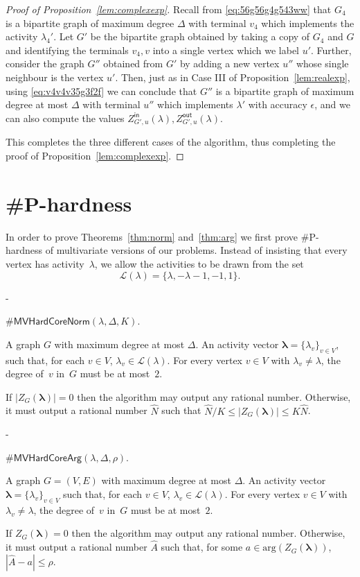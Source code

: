 \documentclass[11pt]{article}
\makeatletter
\renewcommand\arg{\text{arg}}
\def\Zin{Z^{\mathsf{in}}}
\def\Zout{Z^{\mathsf{out}}}
\def\lambdab{\ensuremath{\boldsymbol{\lambda}}}
\def\FactorMVHardCore#1{\#\ensuremath{\mathsf{MVHardCoreNorm}(\lambda,\Delta,#1)}}
\def\ArgMVHardCore#1{\#\ensuremath{\mathsf{MVHardCoreArg}(\lambda,\Delta,#1)}}
\def\prob#1#2#3{\goodbreak\begin{list}{}{\labelwidth\z@ \itemindent-\leftmargin
                        \itemsep\z@  \topsep6\p@\@plus6\p@
                        \let\makelabel\descriptionlabel}
                \item[\it Name]#1
               \item[\it Instance]                #2
                \item[\it Output]#3
                \end{list}}
\makeatother
\begin{document}
\begin{proof}[Proof of Proposition~\ref{lem:complexexp}]
Recall from \eqref{eq:56g56g4g543ww} that $G_4$ is a bipartite graph of maximum degree $\Delta$  with terminal $v_4$ which implements the activity $\lambda_4'$. Let $G'$ be the bipartite graph obtained by taking  a copy of $G_4$ and $G$ and identifying the terminals $v_4,v$ into a single vertex which we label $u'$. Further, consider the graph $G''$ obtained from $G'$ by adding a new vertex $u''$ whose single neighbour is the vertex $u'$. Then, just as in Case III of Proposition~\ref{lem:realexp}, using \eqref{eq:v4v4v35g3f2f} we can conclude that $G''$ is a bipartite graph of maximum degree at most $\Delta$ with terminal $u''$ which implements $\lambda'$ with accuracy $\epsilon$, and we can also compute the values $\Zin_{G',u}(\lambda),\Zout_{G',u}(\lambda)$.

\vskip 0.2cm

This completes the three different cases of the algorithm, thus completing the proof of Proposition~\ref{lem:complexexp}.
\end{proof}

\section{ \#P-hardness}\label{sec:reductions}

In order to prove Theorems~\ref{thm:norm} and~\ref{thm:arg} 
we first prove \#P-hardness of multivariate versions of our problems.
Instead of insisting that every vertex has activity~$\lambda$, we allow the
activities to be drawn from  
the set
\begin{equation}\label{eq:Llam}
\mathcal{L}(\lambda) = \{\lambda,-\lambda-1,-1,1\}.
\end{equation}

 \prob{
$\FactorMVHardCore{K}$.} { A  graph $G$ with maximum degree at
most $\Delta$. An activity vector $\lambdab=\{\lambda_v\}_{v\in V}$, such that, for each $v\in V$, $\lambda_v \in \mathcal{L}(\lambda)$.
For every vertex $v\in V$ with $\lambda_v\neq \lambda$, the degree of~$v$ in~$G$ must be at most~$2$.} 
{   If $|Z_G(\lambdab)|=0$  then the algorithm may output any rational number. Otherwise,
 it must output a  rational number $\widehat{N}$ such that
$\widehat{N}/K \leq
|Z_{G}(\lambdab)|\leq K \widehat{N}$. }  
 
  \prob{
$\ArgMVHardCore{\rho}$.} {A graph $G=(V,E)$ with maximum degree at
most $\Delta$. An activity vector $\lambdab=\{\lambda_v\}_{v\in V}$ such that, for each $v\in V$, $\lambda_v \in \mathcal{L}(\lambda)$.
For every vertex $v\in V$ with $\lambda_v\neq \lambda$, the degree of~$v$ in~$G$ must be at most~$2$.
 }
{ If $Z_G(\lambdab)=0$ then the algorithm may output any rational number. Otherwise, it must output  
a rational number $\widehat{A}$ such that, for some
$a\in \arg(Z_{G}(\lambdab))$,
$ |\widehat{A} - a| \leq \rho$.  }  
 
\end{document}
